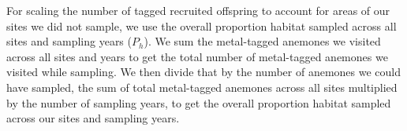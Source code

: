 \documentclass[12pt, oneside]{article}   	%
\begin{document}
For scaling the number of tagged recruited offspring to account for areas of our sites we did not sample, we use the overall proportion habitat sampled across all sites and sampling years ($P_h$). We sum the metal-tagged anemones we visited across all sites and years to get the total number of metal-tagged anemones we visited while sampling. We then divide that by the number of anemones we could have sampled, the sum of total metal-tagged anemones across all sites multiplied by the number of sampling years, to get the overall proportion habitat sampled across our sites and sampling years.


\end{document}
